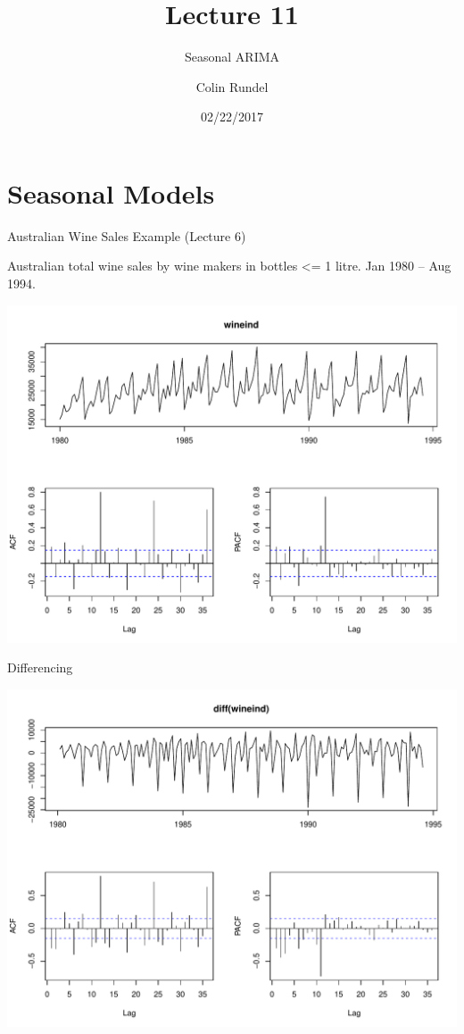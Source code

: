 \documentclass[11pt,ignorenonframetext,]{beamer}
\title{Lecture 11}
\subtitle{Seasonal ARIMA}
\author{Colin Rundel}
\date{02/22/2017}
\begin{document}
\frame{\titlepage}

\section{Seasonal Models}\label{seasonal-models}

\begin{frame}{Australian Wine Sales Example (Lecture 6)}

Australian total wine sales by wine makers in bottles \textless{}= 1
litre. Jan 1980 -- Aug 1994.

\includegraphics{Lec11_files/figure-beamer/unnamed-chunk-1-1.pdf}

\end{frame}

\begin{frame}{Differencing}

\includegraphics{Lec11_files/figure-beamer/unnamed-chunk-2-1.pdf}

\end{frame}
\end{document}

